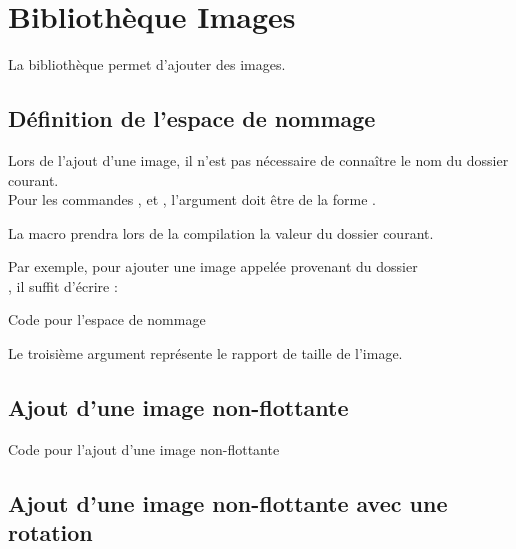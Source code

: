 \chapter{Bibliothèque Images}

La bibliothèque  permet d'ajouter des images.

\section{Définition de l'espace de nommage}
\label{handleImages}

Lors de l'ajout d'une image, il n'est pas nécessaire de connaître le nom du dossier courant.\\

Pour les commandes ,  et , l'argument  doit être de la forme .

La macro \lib{\\rootImages} prendra lors de la compilation la valeur du dossier courant.

Par exemple, pour ajouter une image appelée  provenant du dossier \\
, il suffit d'écrire : 

\begin{Latex}{Code pour l'espace de nommage}
\end{Latex}

Le troisième argument représente le rapport de taille de l'image.


\section{Ajout d'une image non-flottante}


\begin{Latex}{Code pour l'ajout d'une image non-flottante}
\end{Latex}

\section{Ajout d'une image non-flottante avec une rotation}


